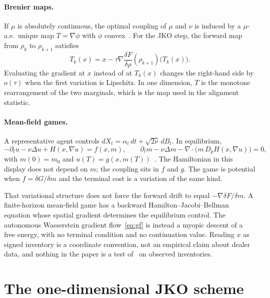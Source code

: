 \documentclass[anon,11pt]{alt2027}
\begin{document}
\paragraph{Brenier maps.}
If $\mu$ is absolutely continuous, the optimal coupling of $\mu$ and $\nu$ is
induced by a $\mu$-a.e.\ unique map $T=\nabla\phi$ with $\phi$
convex~\cite{Brenier91,Villani03}. For the JKO step, the forward map from
$\rho_k$ to $\rho_{k+1}$ satisfies
\begin{equation}
\label{eq:brenier-disc}
T_k(x)
=
x-\tau\nabla\frac{\delta F}{\delta\rho}(\rho_{k+1})\bigl(T_k(x)\bigr).
\end{equation}
Evaluating the gradient at $x$ instead of at $T_k(x)$ changes the right-hand
side by $o(\tau)$ when the first variation is Lipschitz. In one dimension, $T$
is the monotone rearrangement of the two marginals, which is the map used in
the alignment statistic.

\paragraph{Mean-field games.}
A representative agent controls $dX_t=\alpha_t\,dt+\sqrt{2\nu}\,dB_t$. In
equilibrium,
\[
-\partial_t u-\nu\Delta u+H(x,\nabla u)=f(x,m),
\qquad
\partial_t m-\nu\Delta m-\nabla\cdot\bigl(m\,D_p H(x,\nabla u)\bigr)=0,
\]
with $m(0)=m_0$ and $u(T)=g(x,m(T))$~\cite{LasryLions07,CardaliaguetNotes}.
The Hamiltonian in this display does not depend on $m$; the coupling sits in
$f$ and $g$. The game is potential when $f=\delta G/\delta m$ and the terminal
cost is a variation of the same kind.

\begin{remark}
\label{rem:myopic}
That variational structure does not force the forward drift to equal
$-\nabla\delta F/\delta m$. A finite-horizon mean-field game has a backward
Hamilton--Jacobi--Bellman equation whose spatial gradient determines the
equilibrium control. The autonomous Wasserstein gradient flow~\eqref{eq:gf}
is instead a myopic descent of a free energy, with no terminal condition and
no continuation value. Reading $x$ as signed inventory is a coordinate
convention, not an empirical claim about dealer data, and nothing in the
paper is a test of~\citet{AvellanedaStoikov08,GueantLehalleFernandez2013} on
observed inventories.
\end{remark}

\section{The one-dimensional JKO scheme}
\label{app:jko1d}
\end{document}
